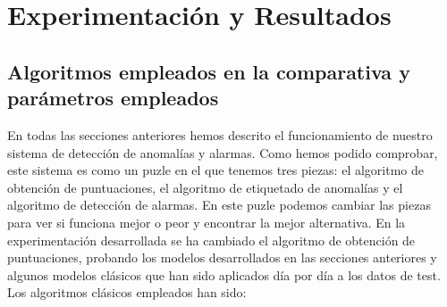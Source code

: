 \chapter{Experimentación y Resultados}
\label{chapter:experimentacion-resultados}

\section{Algoritmos empleados en la comparativa y parámetros empleados}

En todas las secciones anteriores hemos descrito el funcionamiento de nuestro sistema de detección de anomalías y alarmas. Como hemos podido comprobar, este sistema es como un puzle en el que tenemos tres piezas: el algoritmo de obtención de puntuaciones, el algoritmo de etiquetado de anomalías y el algoritmo de detección de alarmas. En este puzle podemos cambiar las piezas para ver si funciona mejor o peor y encontrar la mejor alternativa. En la experimentación desarrollada se ha cambiado el algoritmo de obtención de puntuaciones, probando los modelos desarrollados en las secciones anteriores y algunos modelos clásicos que han sido aplicados día por día a los datos de test. Los algoritmos clásicos empleados han sido: 
